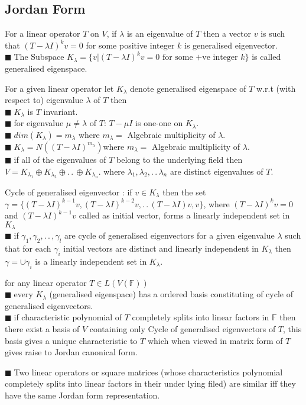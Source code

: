 \documentclass[11pt]{extarticle}
\newcommand{\F}{\mathbb{F}}
\newcommand{\w}[1]{\text{#1}}
\newcommand{\ck}{.\,.\,}
\newcommand{\snote}[1]{{\footnotesize(#1)}}
\newcommand{\tbx}[2][]{
	\begin{tcolorbox}[enhanced,breakable,size=small,colback=black!2!white,title={#1},arc is angular, arc=1.5mm,drop fuzzy shadow]
		#2
	\end{tcolorbox}
}
\newcommand{\y}{$\blacksquare\;$}
\newcommand{\yi}{\\$\blacksquare\;$}
\begin{document}
\begin{multicols}{2}
   	   \section{Jordan Form}
   	   	\tbx[Generalised eigenvectors]{ For a linear operator $ T $ on $V$, if $ \lambda $ is an eigenvalue  of $ T $ then a vector $ v $ is such that $ (T-\lambda I)^kv=0 $ for some positive integer $ k $ is generalised eigenvector.
   	   	\yi The Subspace $ K_\lambda=\{v|(T-\lambda I)^kv=0 \w{ for some +ve integer }k\} $ is called generalised eigenspace.}
   	   	\tbx[properties of generalised eigenspaces]{
   	   	For a given linear operator let $ K_\lambda $ denote generalised eigenspace of $ T $ w.r.t (with respect to) eigenvalue $ \lambda $ of $ T $ then 
   	   		\yi $ K_\lambda $ is $ T $ invariant.
   	   		\yi  for eigenvalue $ \mu \neq \lambda $ of $ T $: $ T-\mu I $ is one-one on $ K_\lambda $.
   	   		\yi $ dim(K_\lambda)=m_\lambda $ where $ m_\lambda= $ Algebraic multiplicity of $\lambda$.    
   	   		\yi $ K_\lambda=N((T-\lambda I)^{m_\lambda}) $where $ m_\lambda= $ Algebraic multiplicity of  $\lambda$.
   	   		\yi if all of the eigenvalues of $ T $ belong to the underlying field then\\
   	   		$ V=K_{\lambda_1}\oplus K_{\lambda_2}\oplus\ck\oplus K_{\lambda_n} .$  where $ \lambda_1,\lambda_2,\ck\lambda_n  $ are distinct eigenvalues of $ T $.   }
   	   		\tbx{Cycle of generalised eigenvector : if  $ v\in K_\lambda $ then the set $ \gamma=\{(T-\lambda I)^{k-1}v,(T-\lambda I)^{k-2}v,\ck (T-\lambda I)v,v\} $, where $ (T-\lambda I)^kv=0 $ and $ (T-\lambda I)^{k-1}v $ called as initial vector, forms a linearly independent set in $ K_\lambda $
   	   		\yi if $ \gamma_1,\gamma_2,\ck, \gamma_l $ are cycle of generalised eigenvectors for a given eigenvalue $ \lambda $ such that for each $ \gamma_i $ initial vectors are distinct and linearly independent in $ K_\lambda $ then $ \gamma=\cup \gamma_i $ is a linearly independent set in $ K_\lambda $.}
   	   		\tbx[existence Jordan canonical form]{ for any linear operator $ T\in L(V(\F)) $
   	   			\yi every $ K_\lambda $ \snote{generalised eigenspace} has a ordered basis constituting of cycle of generalised eigenvectors.
   	   			\yi if characteristic polynomial of $ T $ completely splits into linear factors in $ \F $ then there exist a basis  of $V $ containing only Cycle of generalised eigenvectors of $ T $, this basis gives a unique characteristic to $ T $ which when viewed in matrix form of $ T $ gives raise to Jordan canonical form.}
   	   			\tbx[Consequences of Jordan Form ]{ \y Two linear operators or square matrices \snote{whose characteristics polynomial  completely splits into linear factors in their under lying filed} are similar iff  they have the same Jordan form representation.
}
\end{multicols}
\end{document}
